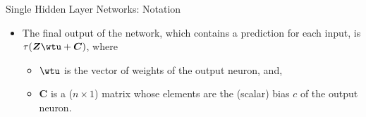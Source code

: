 \begin{vbframe}{Single Hidden Layer Networks: Notation}
\framebreak

  \begin{itemize}
    \vspace{15mm}
    \item The final output of the network, which contains a prediction for each input, is $\tau(\bm{Z}\wtu + \bm{C})$, where
      \begin{itemize}
        \vspace{2mm}
        \item $\wtu$ is the vector of weights of the output neuron, and,
        \vspace{2mm}
        \item $\bm{C}$ is a ($n \times 1$) matrix whose elements are the (scalar) bias $c$ of the output neuron.
      \end{itemize}
  \end{itemize}
\end{vbframe}

